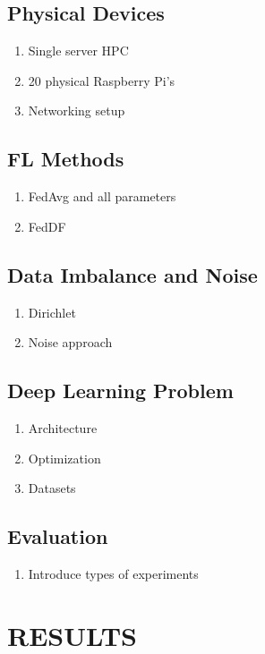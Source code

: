 \documentclass{article}
\begin{document}
\subsection{Physical Devices}
\begin{enumerate}
    \item Single server HPC 
    \item 20 physical Raspberry Pi's
    \item Networking setup
\end{enumerate}

\subsection{FL Methods}
\begin{enumerate}
    \item FedAvg and all parameters
    \item FedDF
\end{enumerate}

\subsection{Data Imbalance and Noise}
\begin{enumerate}
    \item Dirichlet
    \item Noise approach
\end{enumerate}

\subsection{Deep Learning Problem}
\begin{enumerate}
    \item Architecture
    \item Optimization
    \item Datasets
\end{enumerate}

\subsection{Evaluation}
\begin{enumerate}
    \item Introduce types of experiments
\end{enumerate}

\section{RESULTS}%
\label{sec:results}
\end{document}
